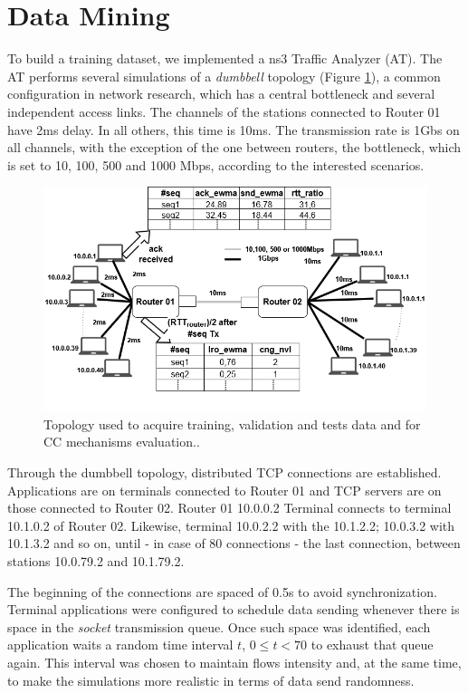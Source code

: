 \documentclass[a4paper,fleqn]{cas-sc}
\begin{document}
\section{Data Mining}
To build a training dataset, we implemented a ns3  Traffic Analyzer (AT). The AT performs several simulations of a \textit{dumbbell} topology (Figure \ref{fig:dumbell}), a common configuration in network research, which has a central bottleneck and several independent access links. The channels of the stations connected to Router 01 have 2ms delay. In all others, this time is 10ms. The transmission rate is 1Gbs on all channels, with the exception of the one between routers, the bottleneck, which is set to 10, 100, 500 and 1000 Mbps, according to the interested scenarios.

\begin{figure}[!htb]
	\centering
	\includegraphics[width=.4\textwidth]{figs//dumbell_final_EN.png}
	\caption{Topology used to acquire training, validation and tests data and for CC mechanisms evaluation..}
	\label{fig:dumbell}
\end{figure}


Through the dumbbell topology, distributed TCP connections are established. Applications are on terminals connected to Router 01 and TCP servers are on those connected to Router 02. Router 01 10.0.0.2 Terminal connects to terminal 10.1.0.2 of Router 02. Likewise, terminal 10.0.2.2 with the 10.1.2.2; 10.0.3.2 with 10.1.3.2 and so on, until - in case of 80 connections - the last connection, between stations 10.0.79.2 and 10.1.79.2. 

The beginning of the connections are spaced of 0.5s to avoid synchronization. Terminal applications were configured to schedule data sending whenever there is space in the \textit{socket} transmission queue. Once such space was identified, each application waits a random time interval $t$, $0\leq t < 70$ to exhaust that queue again. This interval was chosen to maintain flows intensity and, at the same time, to make the simulations more realistic in terms of data send randomness.
\end{document}
